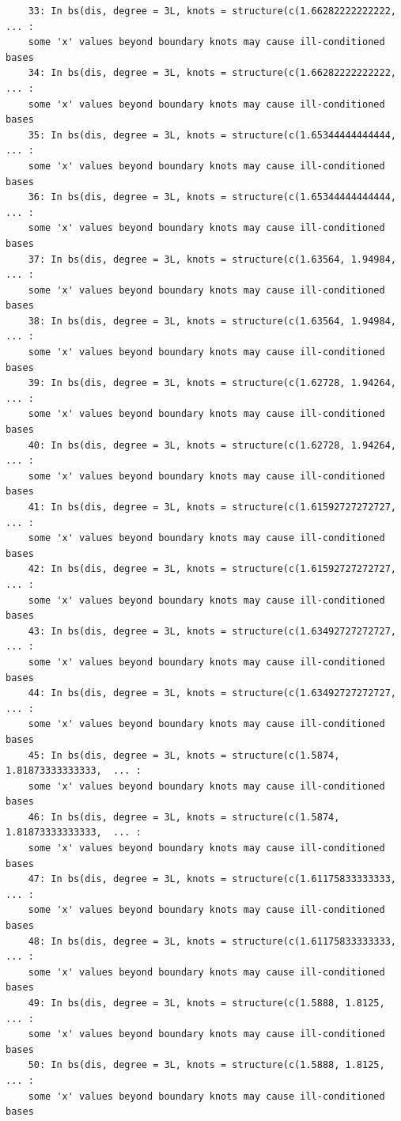 \documentclass{article}
\begin{document}
\begin{program}
\begin{verbatim}
	33: In bs(dis, degree = 3L, knots = structure(c(1.66282222222222,  ... :
	some 'x' values beyond boundary knots may cause ill-conditioned bases
	34: In bs(dis, degree = 3L, knots = structure(c(1.66282222222222,  ... :
	some 'x' values beyond boundary knots may cause ill-conditioned bases
	35: In bs(dis, degree = 3L, knots = structure(c(1.65344444444444,  ... :
	some 'x' values beyond boundary knots may cause ill-conditioned bases
	36: In bs(dis, degree = 3L, knots = structure(c(1.65344444444444,  ... :
	some 'x' values beyond boundary knots may cause ill-conditioned bases
	37: In bs(dis, degree = 3L, knots = structure(c(1.63564, 1.94984,  ... :
	some 'x' values beyond boundary knots may cause ill-conditioned bases
	38: In bs(dis, degree = 3L, knots = structure(c(1.63564, 1.94984,  ... :
	some 'x' values beyond boundary knots may cause ill-conditioned bases
	39: In bs(dis, degree = 3L, knots = structure(c(1.62728, 1.94264,  ... :
	some 'x' values beyond boundary knots may cause ill-conditioned bases
	40: In bs(dis, degree = 3L, knots = structure(c(1.62728, 1.94264,  ... :
	some 'x' values beyond boundary knots may cause ill-conditioned bases
	41: In bs(dis, degree = 3L, knots = structure(c(1.61592727272727,  ... :
	some 'x' values beyond boundary knots may cause ill-conditioned bases
	42: In bs(dis, degree = 3L, knots = structure(c(1.61592727272727,  ... :
	some 'x' values beyond boundary knots may cause ill-conditioned bases
	43: In bs(dis, degree = 3L, knots = structure(c(1.63492727272727,  ... :
	some 'x' values beyond boundary knots may cause ill-conditioned bases
	44: In bs(dis, degree = 3L, knots = structure(c(1.63492727272727,  ... :
	some 'x' values beyond boundary knots may cause ill-conditioned bases
	45: In bs(dis, degree = 3L, knots = structure(c(1.5874, 1.81873333333333,  ... :
	some 'x' values beyond boundary knots may cause ill-conditioned bases
	46: In bs(dis, degree = 3L, knots = structure(c(1.5874, 1.81873333333333,  ... :
	some 'x' values beyond boundary knots may cause ill-conditioned bases
	47: In bs(dis, degree = 3L, knots = structure(c(1.61175833333333,  ... :
	some 'x' values beyond boundary knots may cause ill-conditioned bases
	48: In bs(dis, degree = 3L, knots = structure(c(1.61175833333333,  ... :
	some 'x' values beyond boundary knots may cause ill-conditioned bases
	49: In bs(dis, degree = 3L, knots = structure(c(1.5888, 1.8125,  ... :
	some 'x' values beyond boundary knots may cause ill-conditioned bases
	50: In bs(dis, degree = 3L, knots = structure(c(1.5888, 1.8125,  ... :
	some 'x' values beyond boundary knots may cause ill-conditioned bases
	\end{verbatim}
\end{program}
\end{document}
